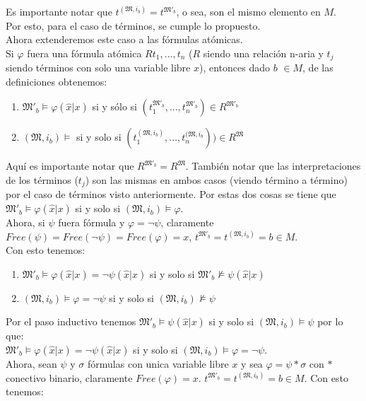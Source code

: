 \begin{sol}
\begin{enumerate}
    \end{enumerate}
    Es importante notar que $t^{(\mathfrak{M},i_b)} = t^{\mathfrak{M}'_b}$, o sea, son el mismo elemento en $M$.\\
    Por esto, para el caso de términos, se cumple lo propuesto.\\
    Ahora extenderemos este caso a las fórmulas atómicas. \\
    Si $\varphi$ fuera una fórmula atómica $Rt_1,...,t_n$ ($R$ siendo una relación n-aria y $t_j$ siendo términos con solo una variable libre $x$), entonces dado $b$ $\in M$, de las definiciones obtenemos: \begin{enumerate}
        \item $\mathfrak{M}'_b \models \varphi (\hat{x}|x)$ si y sólo si $(t_1^{\mathfrak{M}'_b},...,t_n^{\mathfrak{M}'_b}) \in R^{\mathfrak{M}'_b}$
        \item $(\mathfrak{M},i_b) \models$ si y solo si $(t_1^{(\mathfrak{M},i_b)},...,t_n^{(\mathfrak{M},i_b})) \in R^{\mathfrak{M}}$
    \end{enumerate}
    Aquí es importante notar que $R^{\mathfrak{M}'_b} = R^{\mathfrak{M}}$. También notar que las interpretaciones de los términos ($t_j$) son las mismas en ambos casos (viendo término a término) por el caso de términos visto anteriormente. Por estas dos cosas se tiene que $\mathfrak{M}'_b \models \varphi (\hat{x}|x)$ si y solo si $(\mathfrak{M},i_b) \models \varphi$.\\
    Ahora, si $\psi$ fuera fórmula y $\varphi = \neg \psi$, claramente $Free(\psi)=Free(\neg \psi)=Free(\varphi)=x$, $t^{\mathfrak{M}'_b}=t^{(\mathfrak{M},i_b)}=b \in M$.\\
    Con esto tenemos: \begin{enumerate}
        \item $\mathfrak{M}'_b \models \varphi (\hat{x}|x) = \neg \psi (\hat{x}|x)$ si y solo si $\mathfrak{M}'_b \nvDash \psi (\hat{x}|x)$
        \item $(\mathfrak{M},i_b) \models \varphi = \neg \psi$ si y solo si $(\mathfrak{M},i_b) \nvDash \psi$
    \end{enumerate}
    Por el paso inductivo tenemos $\mathfrak{M}'_b \models \psi (\hat{x}|x)$ si y solo si $(\mathfrak{M},i_b) \models \psi$ por lo que:\\
    $\mathfrak{M}'_b \models \varphi (\hat{x}|x) = \neg \psi (\hat{x}|x)$ si y solo si $(\mathfrak{M},i_b) \models \varphi = \neg \psi$.\\
    Ahora, sean $\psi$ y $\sigma$ fórmulas con unica variable libre $x$ y sea $\varphi = \psi * \sigma$ con $*$ conectivo binario, claramente $Free(\varphi)=x$. $t^{\mathfrak{M}'_b}=t^{(\mathfrak{M},i_b)}=b \in M$. Con esto tenemos: \begin{enumerate}

\end{enumerate}
\end{sol}
